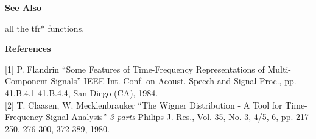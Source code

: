 {\bf \large {}\selectfont See Also}\\
\hspace*{1.5cm}
\begin{minipage}[t]{13.5cm}
all the {\ty tfr*} functions.
\end{minipage}
\vspace*{.5cm}

{\bf \large {}\selectfont References}\\
\hspace*{1.5cm}
\begin{minipage}[t]{13.5cm}
[1] P. Flandrin ``Some Features of Time-Frequency Representations of
Multi-Component Signals'' IEEE Int. Conf. on Acoust. Speech and Signal
Proc., pp. 41.B.4.1-41.B.4.4, San Diego (CA), 1984.\\

[2] T. Claasen, W. Mecklenbrauker ``The Wigner Distribution - A Tool for
Time-Frequency Signal Analysis'' {\it 3 parts} Philips
J. Res., Vol. 35, No. 3, 4/5, 6, pp. 217-250, 276-300, 372-389, 1980.
\end{minipage}



